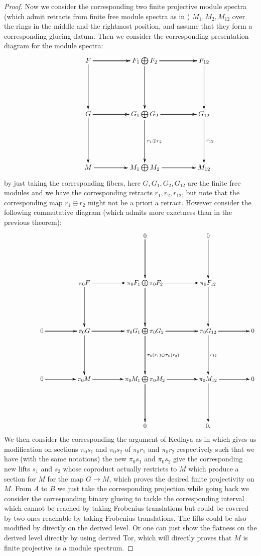 \documentclass[12pt]{amsart}
\theoremstyle{definition}
\numberwithin{equation}{section}
\begin{document}
\begin{proof}
Now we consider the corresponding two finite projective module spectra (which admit retracts from finite free module spectra as in \cite[Proposition 7.2.2.7]{Lu1}) $M_1,M_2,M_{12}$ over the rings in the middle and the rightmost position, and assume that they form a corresponding glueing datum. Then we consider the corresponding presentation diagram for the module spectra:
\[
\xymatrix@C+2pc@R+3pc{
 &F \ar[r] \ar[r] \ar[r] \ar[d] \ar[d] \ar[d] &F_1\bigoplus F_2 \ar[d] \ar[d] \ar[d] \ar[r] \ar[r] \ar[r] &F_{12} \ar[d] \ar[d] \ar[d] \\
&G \ar[r] \ar[r] \ar[r] \ar[d] \ar[d] \ar[d] &G_1\bigoplus G_2 \ar[d]^{r_1\oplus r_2} \ar[d] \ar[d] \ar[r] \ar[r] \ar[r] &G_{12} \ar[d]^{r_{12}} \ar[d] \ar[d] \\
&M \ar[r] \ar[r] \ar[r] &M_1\bigoplus M_2 \ar[r] \ar[r] \ar[r] &M_{12} \\
}
\]  
by just taking the corresponding fibers, here $G,G_1,G_2,G_{12}$ are the finite free modules and we have the corresponding retracts $r_1,r_2,r_{12}$, but note that the corresponding map $r_1\oplus r_2$ might not be a priori a retract. However consider the following commutative diagram (which admits more exactness than in the previous theorem):
\[
\xymatrix@C+2pc@R+3pc{
&& &0 \ar[d] \ar[d] \ar[d] &0 \ar[d] \ar[d] \ar[d] \\
& &\pi_0 F \ar[r] \ar[r] \ar[r] \ar[d] \ar[d] \ar[d] &\pi_0F_1\bigoplus \pi_0F_2 \ar[d] \ar[d] \ar[d] \ar[r] \ar[r] \ar[r] &\pi_0F_{12} \ar[d] \ar[d] \ar[d] \\
&0 \ar[r] \ar[r] \ar[r] &\pi_0G \ar[r] \ar[r] \ar[r] \ar[d] \ar[d] \ar[d] &\pi_0G_1\bigoplus \pi_0G_2 \ar[d]^{\pi_0(r_1)\oplus \pi_0(r_2)} \ar[d] \ar[d] \ar[r] \ar[r] \ar[r] &\pi_0G_{12} \ar[d]^{r_{12}} \ar[d] \ar[d] \ar[r] \ar[r] \ar[r]&0 \\
&0 \ar[r] \ar[r] \ar[r] &\pi_0M \ar[r] \ar[r] \ar[r] &\pi_0M_1\bigoplus \pi_0M_2\ar[d] \ar[d] \ar[d]  \ar[r] \ar[r] \ar[r] &\pi_0M_{12}\ar[d] \ar[d] \ar[d]  \ar[r] \ar[r] \ar[r]&0 \\
&&&0&0.
}
\] 
We then consider the corresponding the argument of Kedlaya as in \cite[Proposition 5.11]{XT3} which gives us modification on sections $\pi_0s_1$ and $\pi_0 s_2$ of $\pi_0 r_1$ and $\pi_0 r_2$ respectively such that we have (with the same notations) the new $\pi_0 s_1$ and $\pi_0 s_2$ give the corresponding new lifts $s_1$ and $s_2$ whose coproduct actually restricts to $M$ which produce a section for $M$ for the map $G\rightarrow M$, which proves the desired finite projectivity on $M$. From $A$ to $B$ we just take the corresponding projection while going back we consider the corresponding binary glueing to tackle the corresponding interval which cannot be reached by taking Frobenius translations but could be covered by two ones reachable by taking Frobenius translations. The lifts could be also modified by directly on the derived level. Or one can just show the flatness on the derived level directly by using derived Tor, which will directly proves that $M$ is finite projective as a module spectrum.
\end{proof}
\end{document}
